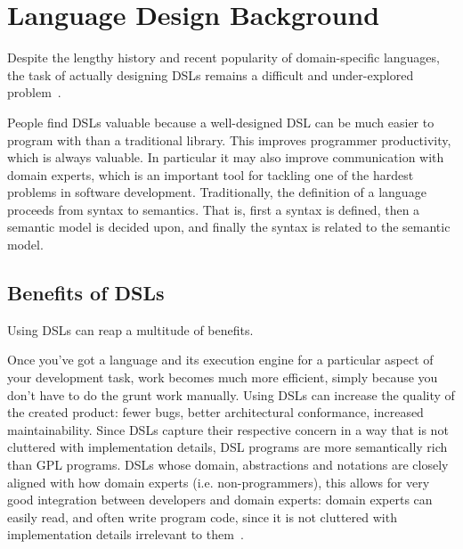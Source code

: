 \section{Language Design Background}
Despite the lengthy history and recent popularity of domain-specific languages, the task of actually
designing DSLs remains a difficult and under-explored problem~\cite{erwig2014semantics}.

People find DSLs valuable because a well-designed DSL can be much easier to program with than a traditional library. This improves programmer productivity, which is always valuable. In particular it may also improve communication with domain experts, which is an important tool for tackling one of the hardest problems in software development.
Traditionally, the definition of a language proceeds from syntax to semantics. That is, first a syntax is
defined, then a semantic model is decided upon, and finally the syntax is related to the semantic model. 

\subsection{Benefits of DSLs}
Using DSLs can reap a multitude of benefits. 

Once you’ve got a language and its execution engine for a particular aspect of your development task, work becomes much more efficient, simply because you don’t have to do the grunt work manually. 
Using DSLs can increase the quality of the created product: fewer bugs, better architectural conformance, increased maintainability.
Since DSLs capture their respective concern in a way that is not cluttered with implementation details, DSL programs are more semantically rich than GPL programs.
DSLs whose domain, abstractions and notations are closely aligned with how domain experts (i.e. non-programmers), this allows for very good integration between developers and domain experts: domain experts can easily read, and often write program code, since it is not cluttered with implementation details irrelevant to them~\cite{voelter2013dsl}.